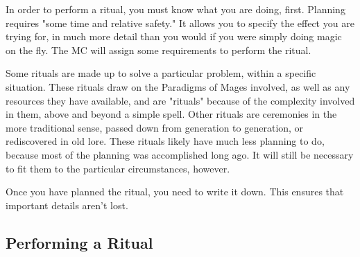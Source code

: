 \documentclass[
  oneside,
  statementpaper,
  9pt]{memoir}
\begin{document}
\begin{Player}

In order to perform a ritual, you must know what you are doing, first. Planning requires "some time and relative safety." It allows you to specify the effect you are trying for, in much more detail than you would if you were simply doing magic on the fly. The MC will assign some requirements to perform the ritual.

Some rituals are made up to solve a particular problem, within a specific situation. These rituals draw on the Paradigms of Mages involved, as well as any resources they have available, and are "rituals" because of the complexity involved in them, above and beyond a simple spell. Other rituals are ceremonies in the more traditional sense, passed down from generation to generation, or rediscovered in old lore. These rituals likely have much less planning to do, because most of the planning was accomplished long ago. It will still be necessary to fit them to the particular circumstances, however.

Once you have planned the ritual, you need to write it down. This ensures that important details aren’t lost.

\end{Player}

\hypertarget{performing-a-ritual}{%
\subsection{Performing a Ritual}\label{performing-a-ritual}}
\end{document}
